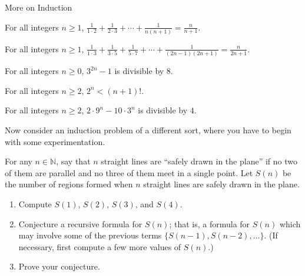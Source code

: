 \begin{section}{More on Induction}
\begin{theorem}
For all integers $n \ge 1$, $\displaystyle{\frac{1}{1\cdot 2} + \frac{1}{2\cdot 3} + \cdots + \frac{1}{n(n+1)} = \frac{n}{n+1}}$.
\end{theorem}

\begin{theorem}
For all integers $n \ge 1$, $\displaystyle{\frac{1}{1\cdot 3} + \frac{1}{3\cdot 5} + \frac{1}{5\cdot7} + \cdots + \frac{1}{(2n-1)(2n+1)} = \frac{n}{2n+1}}$.
\end{theorem}

\begin{theorem}
For all integers $n \ge 0$, $3^{2n}-1$ is divisible by $8$.
\end{theorem}

\begin{theorem}
For all integers $n \ge 2$, $2^n < (n+1)!$.
\end{theorem}

\begin{theorem}
For all integers $n \ge 2$, $2\cdot 9^n - 10 \cdot 3^n$ is divisible by $4$.
\end{theorem}

Now consider an induction problem of a different sort, where you have to begin with some experimentation.

\begin{problem}
For any $n \in \mathbb{N}$, say that $n$ straight lines are ``safely drawn in the plane'' if no two of them are parallel and no three of them meet in a single point. Let $S(n)$ be the number of regions formed when $n$ straight lines are safely drawn in the plane.
\begin{enumerate}[label=\textrm{(\alph*)}]
\item Compute $S(1)$, $S(2)$, $S(3)$, and $S(4)$.
\item Conjecture a recursive formula for $S(n)$; that is, a formula for $S(n)$ which may involve some of the previous terms $\{S(n-1), S(n-2), \ldots\}$. (If necessary, first compute a few more values of $S(n)$.)
\item Prove your conjecture.
\end{enumerate}
\end{problem}


\end{section}
